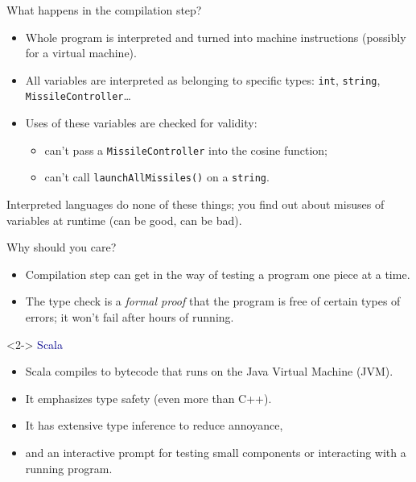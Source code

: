 \documentclass{beamer}
\begin{document}
\begin{frame}{What happens in the compilation step?}
\begin{itemize}
\item Whole program is interpreted and turned into machine instructions (possibly for a virtual machine).
\item All variables are interpreted as belonging to specific types: {\tt int}, {\tt string}, {\tt MissileController}\ldots
\item Uses of these variables are checked for validity:
\begin{itemize}
\item can't pass a {\tt MissileController} into the cosine function;
\item can't call {\tt launchAllMissiles()} on a {\tt string}.
\end{itemize}
\end{itemize}

\vfill
Interpreted languages do none of these things; you find out about misuses of variables at runtime (can be good, can be bad).
\end{frame}

\begin{frame}{Why should you care?}
\begin{itemize}
\item Compilation step can get in the way of testing a program one piece at a time.
\item The type check is a {\it formal proof} that the program is free of certain types of errors; it won't fail after hours of running.
\end{itemize}

\vfill
\begin{uncoverenv}<2->
\hspace{-0.83 cm} \textcolor{darkblue}{\Large Scala}

\begin{itemize}
\item Scala compiles to bytecode that runs on the Java Virtual Machine (JVM).
\item It emphasizes type safety (even more than C++).
\item It has extensive type inference to reduce annoyance,
\item and an interactive prompt for testing small components or interacting with a running program.
\end{itemize}
\end{uncoverenv}
\end{frame}
\end{document}
